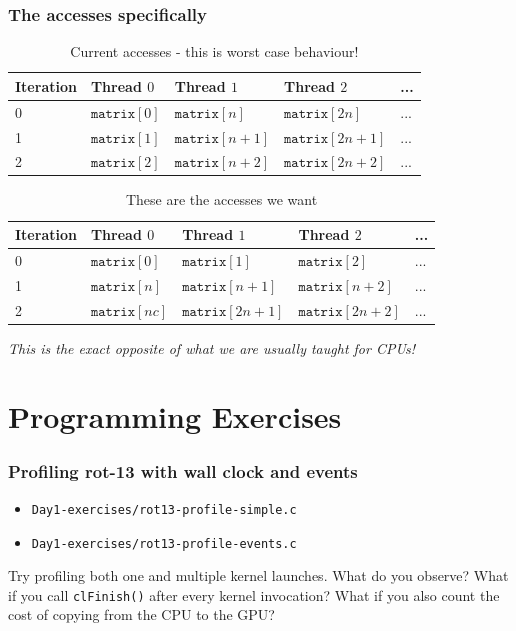\documentclass{beamer}
\begin{document}
\begin{frame}
  \frametitle{The accesses specifically}

\begin{table}[H]
\caption{Current accesses - this is worst case behaviour!}
  \begin{tabular}{l|llll}
    \textbf{Iteration} & \textbf{Thread $0$} & \textbf{Thread $1$} & \textbf{Thread $2$} & ... \\\hline
    0 & $\texttt{matrix}[0]$ & $\texttt{matrix}[n]$ & $\texttt{matrix}[2n]$ & ... \\
    1 & $\texttt{matrix}[1]$ & $\texttt{matrix}[n+1]$ & $\texttt{matrix}[2n+1]$ & ... \\
    2 & $\texttt{matrix}[2]$ & $\texttt{matrix}[n+2]$ & $\texttt{matrix}[2n+2]$ & ... \\
  \end{tabular}
\end{table}

\begin{table}[H]
\caption{These are the accesses we want}
  \begin{tabular}{l|llll}
    \textbf{Iteration} & \textbf{Thread $0$} & \textbf{Thread $1$} & \textbf{Thread $2$} & ... \\\hline
    0 & $\texttt{matrix}[0]$ & $\texttt{matrix}[1]$ & $\texttt{matrix}[2]$ & ... \\
    1 & $\texttt{matrix}[n]$ & $\texttt{matrix}[n+1]$ & $\texttt{matrix}[n+2]$ & ... \\
    2 & $\texttt{matrix}[nc]$ & $\texttt{matrix}[2n+1]$ & $\texttt{matrix}[2n+2]$ & ... \\
  \end{tabular}
\end{table}

\textit{This is the exact opposite of what we are usually taught for
  CPUs!}

\end{frame}

\section{Programming Exercises}

\begin{frame}
	\tableofcontents[currentsection]
\end{frame}

\begin{frame}
  \frametitle{Profiling rot-13 with wall clock and events}

  \begin{itemize}
  \item \texttt{Day1-exercises/rot13-profile-simple.c}
  \item \texttt{Day1-exercises/rot13-profile-events.c}
  \end{itemize}

  Try profiling both one and multiple kernel launches.  What do you
  observe?  What if you call \texttt{clFinish()} after every kernel
  invocation?  What if you also count the cost of copying from the CPU
  to the GPU?

\end{frame}
\end{document}
